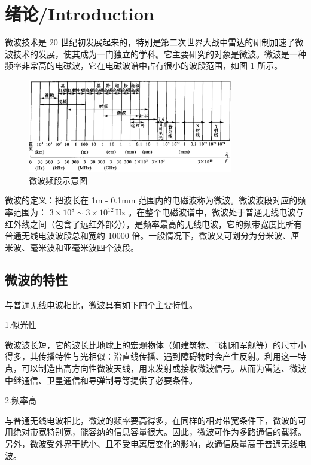
\section{绪论/Introduction}

微波技术是 20 世纪初发展起来的，特别是第二次世界大战中雷达的研制加速了微波技术的发展，使其成为一门独立的学科。它主要研究的对象是微波。微波是一种频率非常高的电磁波，它在电磁波谱中占有很小的波段范围，如图 1 所示。

\begin{figure}[htbp]
	\centering
	\includegraphics[width=0.8\textwidth]{img/1-1.png} %
	\caption{微波频段示意图 \cite{chen2019artificial}}
	\label{fig:example}
\end{figure}

微波的定义：把波长在 1m - 0.1mm 范围内的电磁波称为微波。微波波段对应的频率范围为：
\( 3 \times 10^8 \sim 3 \times 10^{12} \, \text{Hz} \)
。在整个电磁波谱中，微波处于普通无线电波与红外线之间（包含了远红外部分），是频率最高的无线电波，它的频带宽度比所有普通无线电波波段总和宽约 10000 倍。一般情况下，微波又可划分为分米波、厘米波、毫米波和亚毫米波四个波段。

\subsection{微波的特性}
与普通无线电波相比，微波具有如下四个主要特性。

1.似光性

微波波长短，它的波长比地球上的宏观物体（如建筑物、飞机和军舰等）的尺寸小得多，其传播特性与光相似：沿直线传播、遇到障碍物时会产生反射。利用这一特点，可以制造出高方向性微波天线，用来发射或接收微波信号。从而为雷达、微波中继通信、卫星通信和导弹制导等提供了必要条件。

2.频率高

与普通无线电波相比，微波的频率要高得多，在同样的相对带宽条件下，微波的可用绝对带宽特别宽，能容纳的信息容量很大。因此，微波可作为多路通信的载频。另外，微波受外界干扰小、且不受电离层变化的影响，故通信质量高于普通无线电波。

